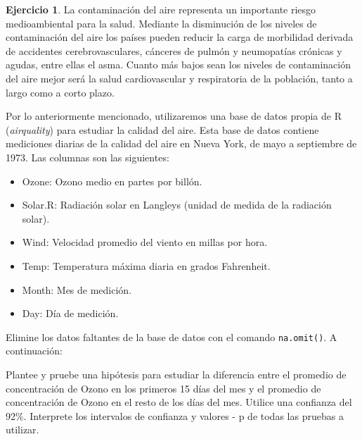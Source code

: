 \documentclass[
  11pt,
]{book}
\providecommand{\tightlist}{%
  \setlength{\itemsep}{0pt}\setlength{\parskip}{0pt}}
\theoremstyle{definition}
\theoremstyle{definition}
\theoremstyle{definition}
\newtheorem{exercise}{Ejercicio}[chapter]
\theoremstyle{definition}
\theoremstyle{remark}
\begin{document}
\begin{exercise}
La contaminación del aire representa un importante riesgo medioambiental para la salud. Mediante la disminución de los niveles de contaminación del aire los países pueden reducir la carga de morbilidad derivada de accidentes cerebrovasculares, cánceres de pulmón y neumopatías crónicas y agudas, entre ellas el asma. Cuanto más bajos sean los niveles de contaminación del aire mejor será la salud cardiovascular y respiratoria de la población, tanto a largo como a corto plazo.

Por lo anteriormente mencionado, utilizaremos una base de datos propia de R (\emph{airquality}) para estudiar la calidad del aire. Esta base de datos contiene mediciones diarias de la calidad del aire en Nueva York, de mayo a septiembre de 1973. Las columnas son las siguientes:

\begin{itemize}
\tightlist
\item
  Ozone: Ozono medio en partes por billón.
\item
  Solar.R: Radiación solar en Langleys (unidad de medida de la radiación solar).
\item
  Wind: Velocidad promedio del viento en millas por hora.
\item
  Temp: Temperatura máxima diaria en grados Fahrenheit.
\item
  Month: Mes de medición.
\item
  Day: Día de medición.
\end{itemize}

Elimine los datos faltantes de la base de datos con el comando \texttt{na.omit()}. A continuación:

Plantee y pruebe una hipótesis para estudiar la diferencia entre el promedio de concentración de Ozono en los primeros 15 días del mes y el promedio de concentración de Ozono en el resto de los días del mes. Utilice una confianza del 92\%. Interprete los intervalos de confianza y valores - p de todas las pruebas a utilizar.
\end{exercise}
\end{document}
